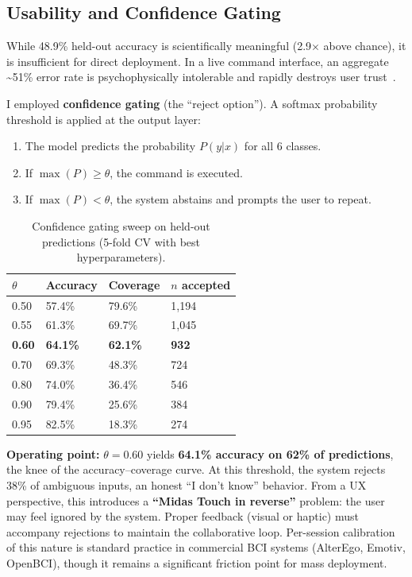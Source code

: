 \documentclass{article}
\begin{document}
\subsection{Usability and Confidence Gating}

While 48.9\% held-out accuracy is scientifically meaningful (2.9$\times$ above chance), it is insufficient for direct deployment. In a live command interface, an aggregate \textasciitilde51\% error rate is psychophysically intolerable and rapidly destroys user trust~\cite{kapur2018}.

I employed \textbf{confidence gating} (the ``reject option''). A softmax probability threshold is applied at the output layer:

\begin{enumerate}
    \item The model predicts the probability $P(y|x)$ for all 6 classes.
    \item If $\max(P) \geq \theta$, the command is executed.
    \item If $\max(P) < \theta$, the system abstains and prompts the user to repeat.
\end{enumerate}

\begin{table}[h]
\centering
\caption{Confidence gating sweep on held-out predictions (5-fold CV with best hyperparameters).}
\label{tab:confgate}
\begin{tabular}{@{}llll@{}}
\toprule
$\theta$ & Accuracy & Coverage & $n$ accepted \\
\midrule
0.50 & 57.4\% & 79.6\% & 1{,}194 \\
0.55 & 61.3\% & 69.7\% & 1{,}045 \\
\textbf{0.60} & \textbf{64.1\%} & \textbf{62.1\%} & \textbf{932} \\
0.70 & 69.3\% & 48.3\% & 724 \\
0.80 & 74.0\% & 36.4\% & 546 \\
0.90 & 79.4\% & 25.6\% & 384 \\
0.95 & 82.5\% & 18.3\% & 274 \\
\bottomrule
\end{tabular}
\end{table}

\textbf{Operating point:} $\theta = 0.60$ yields \textbf{64.1\% accuracy on 62\% of predictions}, the knee of the accuracy--coverage curve. At this threshold, the system rejects 38\% of ambiguous inputs, an honest ``I don't know'' behavior. From a UX perspective, this introduces a \textbf{``Midas Touch in reverse''} problem: the user may feel ignored by the system. Proper feedback (visual or haptic) must accompany rejections to maintain the collaborative loop. Per-session calibration of this nature is standard practice in commercial BCI systems (AlterEgo, Emotiv, OpenBCI), though it remains a significant friction point for mass deployment.
\end{document}
